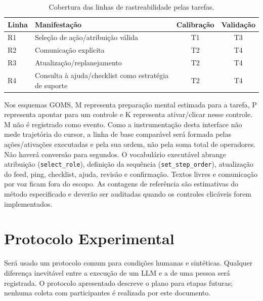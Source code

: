 \documentclass[conference]{IEEEtran}
\begin{document}
\begin{table}[!t]
\centering
\caption{Cobertura das linhas de rastreabilidade pelas tarefas.}
\label{tab:cobertura}
\scriptsize
\begin{tabularx}{\columnwidth}{@{}p{0.65cm}Y c c@{}}
\toprule
\textbf{Linha} & \textbf{Manifestação} & \textbf{Calibração} & \textbf{Validação} \\
\midrule
R1 & Seleção de ação/atribuição válida & T1 & T3 \\
R2 & Comunicação explícita & T2 & T4 \\
R3 & Atualização/replanejamento & T2 & T4 \\
R4 & Consulta à ajuda/checklist como estratégia de suporte & T2 & T4 \\
\bottomrule
\end{tabularx}
\end{table}

Nos esquemas GOMS, M representa preparação mental estimada para a tarefa, P representa apontar para um controle e K representa ativar/clicar nesse controle. M não é registrado como evento. Como a instrumentação desta interface não mede trajetória do cursor, a linha de base comparável será formada pelas ações/ativações executadas e pela sua ordem, não pela soma total de operadores. Não haverá conversão para segundos. O vocabulário executável abrange atribuição (\texttt{select\_role}), definição da sequência (\texttt{set\_step\_order}), atualização do feed, ping, checklist, ajuda, revisão e confirmação. Textos livres e comunicação por voz ficam fora do escopo. As contagens de referência são estimativas do método especificado e deverão ser auditadas quando os controles clicáveis forem implementados.


\section{Protocolo Experimental}

Será usado um protocolo comum para condições humanas e sintéticas. Qualquer diferença inevitável entre a execução de um LLM e a de uma pessoa será registrada. O protocolo apresentado descreve o plano para etapas futuras; nenhuma coleta com participantes é realizada por este documento.
\end{document}

